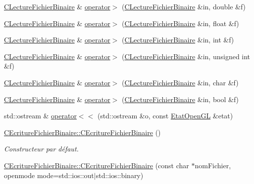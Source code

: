 \begin{DoxyCompactItemize}
\item 
\hyperlink{class_c_lecture_fichier_binaire}{C\-Lecture\-Fichier\-Binaire} \& \hyperlink{group__utilitaire_ga3286b1bfce354ab81b9c5e16318f3726}{operator$>$} (\hyperlink{class_c_lecture_fichier_binaire}{C\-Lecture\-Fichier\-Binaire} \&in, double \&f)
\item 
\hyperlink{class_c_lecture_fichier_binaire}{C\-Lecture\-Fichier\-Binaire} \& \hyperlink{group__utilitaire_ga66a0bc917393930593341bc27a7fa51d}{operator$>$} (\hyperlink{class_c_lecture_fichier_binaire}{C\-Lecture\-Fichier\-Binaire} \&in, float \&f)
\item 
\hyperlink{class_c_lecture_fichier_binaire}{C\-Lecture\-Fichier\-Binaire} \& \hyperlink{group__utilitaire_ga06cd33d9234f45523dd443b122d897fa}{operator$>$} (\hyperlink{class_c_lecture_fichier_binaire}{C\-Lecture\-Fichier\-Binaire} \&in, int \&f)
\item 
\hyperlink{class_c_lecture_fichier_binaire}{C\-Lecture\-Fichier\-Binaire} \& \hyperlink{group__utilitaire_gaf02d6718459c6e38d1ef0350b209da02}{operator$>$} (\hyperlink{class_c_lecture_fichier_binaire}{C\-Lecture\-Fichier\-Binaire} \&in, unsigned int \&f)
\item 
\hyperlink{class_c_lecture_fichier_binaire}{C\-Lecture\-Fichier\-Binaire} \& \hyperlink{group__utilitaire_ga81285ae431b1fa84429945395a36f8ce}{operator$>$} (\hyperlink{class_c_lecture_fichier_binaire}{C\-Lecture\-Fichier\-Binaire} \&in, char \&f)
\item 
\hyperlink{class_c_lecture_fichier_binaire}{C\-Lecture\-Fichier\-Binaire} \& \hyperlink{group__utilitaire_ga1585cce945bae21c66998f92f175b115}{operator$>$} (\hyperlink{class_c_lecture_fichier_binaire}{C\-Lecture\-Fichier\-Binaire} \&in, bool \&f)
\item 
std\-::ostream \& \hyperlink{group__utilitaire_ga07715cf8ba84aab7a025770804188a24}{operator$<$$<$} (std\-::ostream \&o, const \hyperlink{class_etat_open_g_l}{Etat\-Open\-G\-L} \&etat)
\item 
\hyperlink{group__utilitaire_ga5b5846202001fecd71cd2a0afbbdb494}{C\-Ecriture\-Fichier\-Binaire\-::\-C\-Ecriture\-Fichier\-Binaire} ()
\begin{DoxyCompactList}\small\item\em Constructeur par défaut. \end{DoxyCompactList}\item 
\hyperlink{group__utilitaire_gad19b9753aa12a9f25fd0febc3c899024}{C\-Ecriture\-Fichier\-Binaire\-::\-C\-Ecriture\-Fichier\-Binaire} (const char $\ast$nom\-Fichier, openmode mode=std\-::ios\-::out$\vert$std\-::ios\-::binary)

\end{DoxyCompactItemize}
